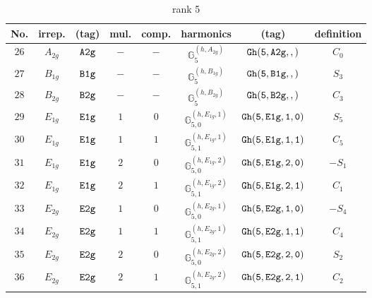 \documentclass[fleqn,8pt]{jsarticle}
\begin{document}
\begin{table}[ht!]
\begin{center}
\caption{rank 5}
\renewcommand{\arraystretch}{1.3}
\begin{tabular}{cccccccc} \hline \hline
No. & irrep. & (tag) & mul. & comp. & harmonics & (tag) & definition \\ \hline
$ 26 $ & $ A_{2g} $ & $ {\tt A2g} $ & $ - $ & $ - $ & $ \mathbb{G}_{5}^{(h,A_{2g})} $ & $ {\tt Gh(5,A2g,,)} $ & $ C_{0} $ \\
$ 27 $ & $ B_{1g} $ & $ {\tt B1g} $ & $ - $ & $ - $ & $ \mathbb{G}_{5}^{(h,B_{1g})} $ & $ {\tt Gh(5,B1g,,)} $ & $ S_{3} $ \\
$ 28 $ & $ B_{2g} $ & $ {\tt B2g} $ & $ - $ & $ - $ & $ \mathbb{G}_{5}^{(h,B_{2g})} $ & $ {\tt Gh(5,B2g,,)} $ & $ C_{3} $ \\
$ 29 $ & $ E_{1g} $ & $ {\tt E1g} $ & $ 1 $ & $ 0 $ & $ \mathbb{G}_{5,0}^{(h,E_{1g},1)} $ & $ {\tt Gh(5,E1g,1,0)} $ & $ S_{5} $ \\
$ 30 $ & $ E_{1g} $ & $ {\tt E1g} $ & $ 1 $ & $ 1 $ & $ \mathbb{G}_{5,1}^{(h,E_{1g},1)} $ & $ {\tt Gh(5,E1g,1,1)} $ & $ C_{5} $ \\
$ 31 $ & $ E_{1g} $ & $ {\tt E1g} $ & $ 2 $ & $ 0 $ & $ \mathbb{G}_{5,0}^{(h,E_{1g},2)} $ & $ {\tt Gh(5,E1g,2,0)} $ & $ - S_{1} $ \\
$ 32 $ & $ E_{1g} $ & $ {\tt E1g} $ & $ 2 $ & $ 1 $ & $ \mathbb{G}_{5,1}^{(h,E_{1g},2)} $ & $ {\tt Gh(5,E1g,2,1)} $ & $ C_{1} $ \\
$ 33 $ & $ E_{2g} $ & $ {\tt E2g} $ & $ 1 $ & $ 0 $ & $ \mathbb{G}_{5,0}^{(h,E_{2g},1)} $ & $ {\tt Gh(5,E2g,1,0)} $ & $ - S_{4} $ \\
$ 34 $ & $ E_{2g} $ & $ {\tt E2g} $ & $ 1 $ & $ 1 $ & $ \mathbb{G}_{5,1}^{(h,E_{2g},1)} $ & $ {\tt Gh(5,E2g,1,1)} $ & $ C_{4} $ \\
$ 35 $ & $ E_{2g} $ & $ {\tt E2g} $ & $ 2 $ & $ 0 $ & $ \mathbb{G}_{5,0}^{(h,E_{2g},2)} $ & $ {\tt Gh(5,E2g,2,0)} $ & $ S_{2} $ \\
$ 36 $ & $ E_{2g} $ & $ {\tt E2g} $ & $ 2 $ & $ 1 $ & $ \mathbb{G}_{5,1}^{(h,E_{2g},2)} $ & $ {\tt Gh(5,E2g,2,1)} $ & $ C_{2} $ \\
 \hline \hline
\end{tabular}
\end{center}
\end{table}
\end{document}

